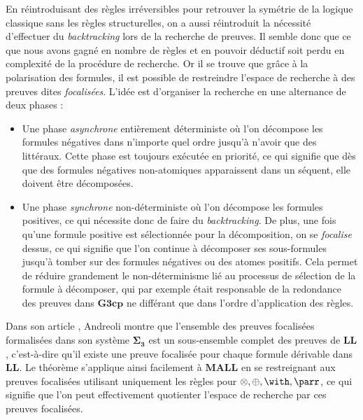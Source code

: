 \documentclass[12pt]{report}
\begin{document}
En réintroduisant des règles irréversibles pour retrouver la symétrie de la logique classique sans les règles structurelles, on a aussi réintroduit la nécessité d'effectuer du \textit{backtracking} lors de la recherche de preuves. Il semble donc que ce que nous avons gagné en nombre de règles et en pouvoir déductif soit perdu en complexité de la procédure de recherche. Or il se trouve que grâce à la polarisation des formules, il est possible de restreindre l'espace de recherche à des preuves dites \emph{focalisées}. L'idée est d'organiser la recherche en une alternance de deux phases :
\begin{itemize}
	\item Une phase \emph{asynchrone} entièrement déterministe où l'on décompose les formules négatives dans n'importe quel ordre jusqu'à n'avoir que des littéraux. Cette phase est toujours exécutée en priorité, ce qui signifie que dès que des formules négatives non-atomiques apparaissent dans un séquent, elle doivent être décomposées.
	\item Une phase \emph{synchrone} non-déterministe où l'on décompose les formules positives, ce qui nécessite donc de faire du \textit{backtracking}. De plus, une fois qu'une formule positive est sélectionnée pour la décomposition, on se \emph{focalise} dessus, ce qui signifie que l'on continue à décomposer ses sous-formules jusqu'à tomber sur des formules négatives ou des atomes positifs. Cela permet de réduire grandement le non-déterminisme lié au processus de sélection de la formule à décomposer, qui par exemple était responsable de la redondance des preuves dans $\mathbf{G3cp}$ ne différant que dans l'ordre d'application des règles.
\end{itemize}

Dans son article \cite{And92}, Andreoli montre que l'ensemble des preuves focalisées formalisées dans son système $\bm{\Sigma}_{\mathbf{3}}$ est un sous-ensemble complet des preuves de $\mathbf{LL}$, c'est-à-dire qu'il existe une preuve focalisée pour chaque formule dérivable dans $\mathbf{LL}$. Le théorème s'applique ainsi facilement à $\mathbf{MALL}$ en se restreignant aux preuves focalisées utilisant uniquement les règles pour $\otimes,\oplus,\with,\parr$, ce qui signifie que l'on peut effectivement quotienter l'espace de recherche par ces preuves focalisées.\\
\end{document}
